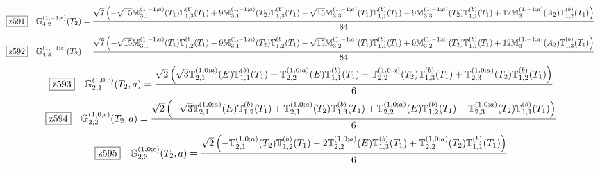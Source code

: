 \documentclass[fleqn,10pt,landscape]{jsarticle}
\begin{document}
\begin{dmath*}
\hspace*{3mm}\fbox{z591}\quad \mathbb{G}_{4,2}^{(1,-1;c)}(T_{2})=\frac{\sqrt{7} \left(- \sqrt{15} \mathbb{M}_{3,1}^{(1,-1;a)}(T_{1}) \mathbb{T}_{1,3}^{(b)}(T_{1}) + 9 \mathbb{M}_{3,1}^{(1,-1;a)}(T_{2}) \mathbb{T}_{1,3}^{(b)}(T_{1}) - \sqrt{15} \mathbb{M}_{3,3}^{(1,-1;a)}(T_{1}) \mathbb{T}_{1,1}^{(b)}(T_{1}) - 9 \mathbb{M}_{3,3}^{(1,-1;a)}(T_{2}) \mathbb{T}_{1,1}^{(b)}(T_{1}) + 12 \mathbb{M}_{3}^{(1,-1;a)}(A_{2}) \mathbb{T}_{1,2}^{(b)}(T_{1})\right)}{84}
\end{dmath*}
\begin{dmath*}
\hspace*{3mm}\fbox{z592}\quad \mathbb{G}_{4,3}^{(1,-1;c)}(T_{2})=\frac{\sqrt{7} \left(- \sqrt{15} \mathbb{M}_{3,1}^{(1,-1;a)}(T_{1}) \mathbb{T}_{1,2}^{(b)}(T_{1}) - 9 \mathbb{M}_{3,1}^{(1,-1;a)}(T_{2}) \mathbb{T}_{1,2}^{(b)}(T_{1}) - \sqrt{15} \mathbb{M}_{3,2}^{(1,-1;a)}(T_{1}) \mathbb{T}_{1,1}^{(b)}(T_{1}) + 9 \mathbb{M}_{3,2}^{(1,-1;a)}(T_{2}) \mathbb{T}_{1,1}^{(b)}(T_{1}) + 12 \mathbb{M}_{3}^{(1,-1;a)}(A_{2}) \mathbb{T}_{1,3}^{(b)}(T_{1})\right)}{84}
\end{dmath*}
\begin{dmath*}
\hspace*{3mm}\fbox{z593}\quad \mathbb{G}_{2,1}^{(1,0;c)}(T_{2},a)=\frac{\sqrt{2} \left(\sqrt{3} \mathbb{T}_{2,1}^{(1,0;a)}(E) \mathbb{T}_{1,1}^{(b)}(T_{1}) + \mathbb{T}_{2,2}^{(1,0;a)}(E) \mathbb{T}_{1,1}^{(b)}(T_{1}) - \mathbb{T}_{2,2}^{(1,0;a)}(T_{2}) \mathbb{T}_{1,3}^{(b)}(T_{1}) + \mathbb{T}_{2,3}^{(1,0;a)}(T_{2}) \mathbb{T}_{1,2}^{(b)}(T_{1})\right)}{6}
\end{dmath*}
\begin{dmath*}
\hspace*{3mm}\fbox{z594}\quad \mathbb{G}_{2,2}^{(1,0;c)}(T_{2},a)=\frac{\sqrt{2} \left(- \sqrt{3} \mathbb{T}_{2,1}^{(1,0;a)}(E) \mathbb{T}_{1,2}^{(b)}(T_{1}) + \mathbb{T}_{2,1}^{(1,0;a)}(T_{2}) \mathbb{T}_{1,3}^{(b)}(T_{1}) + \mathbb{T}_{2,2}^{(1,0;a)}(E) \mathbb{T}_{1,2}^{(b)}(T_{1}) - \mathbb{T}_{2,3}^{(1,0;a)}(T_{2}) \mathbb{T}_{1,1}^{(b)}(T_{1})\right)}{6}
\end{dmath*}
\begin{dmath*}
\hspace*{3mm}\fbox{z595}\quad \mathbb{G}_{2,3}^{(1,0;c)}(T_{2},a)=\frac{\sqrt{2} \left(- \mathbb{T}_{2,1}^{(1,0;a)}(T_{2}) \mathbb{T}_{1,2}^{(b)}(T_{1}) - 2 \mathbb{T}_{2,2}^{(1,0;a)}(E) \mathbb{T}_{1,3}^{(b)}(T_{1}) + \mathbb{T}_{2,2}^{(1,0;a)}(T_{2}) \mathbb{T}_{1,1}^{(b)}(T_{1})\right)}{6}
\end{dmath*}
\end{document}
